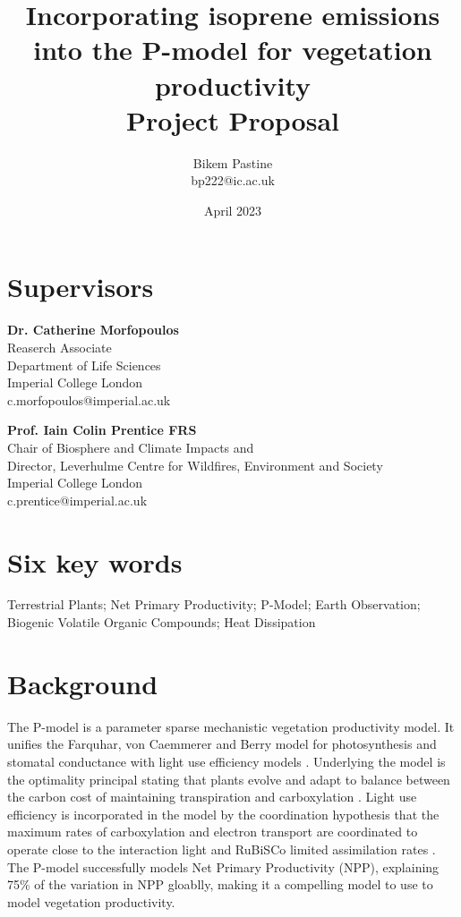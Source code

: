\documentclass[11pt] {article}
\title{\textbf{Incorporating isoprene emissions into the P-model for vegetation productivity}
\\[1ex] \large Project Proposal}
\author{Bikem Pastine
\\[1ex] \large bp222@ic.ac.uk}
\date{April 2023}
\begin{document}
    \maketitle

   \section{Supervisors}

    \textbf{Dr. Catherine Morfopoulos}
    \\Reaserch Associate
    \\Department of Life Sciences
    \\Imperial College London
    \\c.morfopoulos@imperial.ac.uk\par

    \vskip 0.2in
    
    \noindent\textbf{Prof. Iain Colin Prentice FRS}
    \\Chair of Biosphere and Climate Impacts and
    \\Director, Leverhulme Centre for Wildfires, Environment and Society
    \\Imperial College London
    \\c.prentice@imperial.ac.uk

    
    \section{Six key words}
    Terrestrial Plants; Net Primary Productivity; P-Model; Earth Observation; Biogenic Volatile Organic Compounds; Heat Dissipation 
    
    \newpage

    \section{Background}

    The P-model is a parameter sparse mechanistic vegetation productivity model. It unifies the Farquhar, von Caemmerer and Berry model for photosynthesis and stomatal conductance with light use efficiency models \citep{P-Modelv1.0}. Underlying the model is the optimality principal stating that plants evolve and adapt to balance between the carbon cost of maintaining transpiration and carboxylation \citep{ZOU2023128855}. Light use efficiency is incorporated in the model by the coordination hypothesis that the maximum rates of carboxylation and electron transport are coordinated to operate close to the interaction light and RuBiSCo limited assimilation rates \citep{P-Modelv1.0}. The P-model successfully models Net Primary Productivity (NPP), explaining 75\% of the variation in NPP gloablly, making it a compelling  model to use to model vegetation productivity.  
\end{document}
